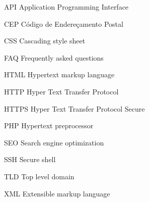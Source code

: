 \documentclass[
	12pt,				%
	oneside,			%
	a4paper,			%
	french,				%
	spanish,			%
	english,			%
	brazil				%
	]{abntex2}
\newcommand{\basePath}{/var/www/html/meninadasbalas/project/monografia/latex}
\begin{document}
\begin{siglas}
  \item[API] Application Programming Interface
  \item[CEP] Código de Endereçamento Postal
  \item[CSS] Cascading style sheet
  \item[FAQ] Frequently asked questions
  \item[HTML] Hypertext markup language
  \item[HTTP] Hyper Text Transfer Protocol
  \item[HTTPS] Hyper Text Transfer Protocol Secure
  \item[PHP] Hypertext preprocessor
  \item[SEO] Search engine optimization
  \item[SSH] Secure shell
  \item[TLD] Top level domain
  \item[XML] Extensible markup language
\end{siglas}

\tableofcontents*
\clearpage

\textual








\postextual

%
%



%
%


\begin{apendicesenv}

\partapendices



\end{apendicesenv}
\end{document}
